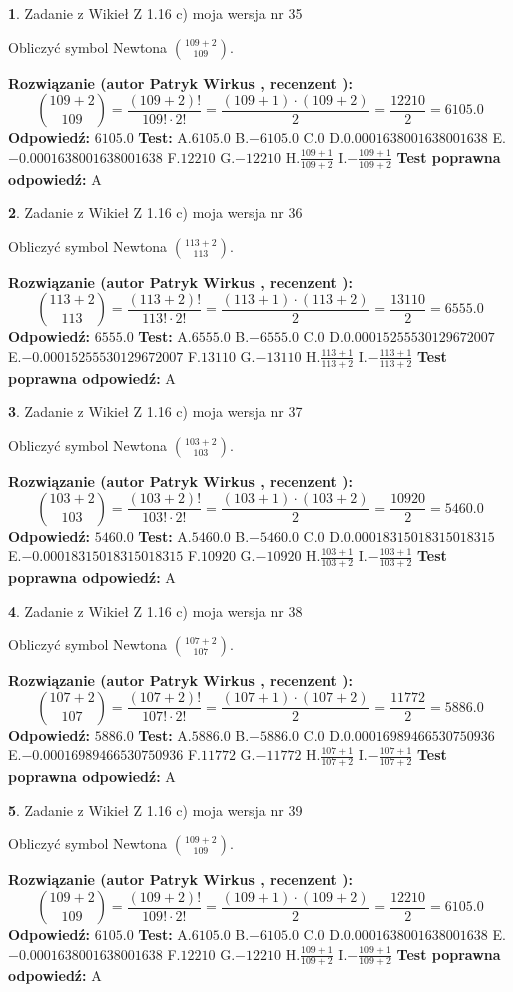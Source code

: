 \documentclass[12pt, a4paper]{article}
\theoremstyle{definition} %
\newtheorem{zad}{}
\newcommand{\zadStart}[1]{\begin{zad}#1\newline}
\newcommand{\zadStop}{\end{zad}}
\newcommand{\rozwStart}[2]{\noindent \textbf{Rozwiązanie (autor #1 , recenzent #2): }\newline}
\newcommand{\rozwStop}{\newline}
\newcommand{\odpStart}{\noindent \textbf{Odpowiedź:}\newline}
\newcommand{\odpStop}{\newline}
\newcommand{\testStart}{\noindent \textbf{Test:}\newline}
\newcommand{\testStop}{\newline}
\newcommand{\kluczStart}{\noindent \textbf{Test poprawna odpowiedź:}\newline}
\newcommand{\kluczStop}{\newline}
\begin{document}
\zadStart{Zadanie z Wikieł Z 1.16 c) moja wersja nr 35}

Obliczyć symbol Newtona ${109+2 \choose 109}$.
\zadStop
\rozwStart{Patryk Wirkus}{}
$${109+2 \choose 109} = \frac{(109+2)!}{109! \cdot 2!} = \frac{(109+1)\cdot(109+2)}{2} = \frac{12210}{2} = 6105.0$$
\rozwStop
\odpStart
$6105.0$
\odpStop
\testStart
A.$6105.0$ B.$-6105.0$ C.$0$ D.$0.0001638001638001638$ E.$-0.0001638001638001638$
F.$12210$ G.$-12210$
H.$\frac{109+1}{109+2}$
I.$-\frac{109+1}{109+2}$
\testStop
\kluczStart
A
\kluczStop



\zadStart{Zadanie z Wikieł Z 1.16 c) moja wersja nr 36}

Obliczyć symbol Newtona ${113+2 \choose 113}$.
\zadStop
\rozwStart{Patryk Wirkus}{}
$${113+2 \choose 113} = \frac{(113+2)!}{113! \cdot 2!} = \frac{(113+1)\cdot(113+2)}{2} = \frac{13110}{2} = 6555.0$$
\rozwStop
\odpStart
$6555.0$
\odpStop
\testStart
A.$6555.0$ B.$-6555.0$ C.$0$ D.$0.00015255530129672007$ E.$-0.00015255530129672007$
F.$13110$ G.$-13110$
H.$\frac{113+1}{113+2}$
I.$-\frac{113+1}{113+2}$
\testStop
\kluczStart
A
\kluczStop



\zadStart{Zadanie z Wikieł Z 1.16 c) moja wersja nr 37}

Obliczyć symbol Newtona ${103+2 \choose 103}$.
\zadStop
\rozwStart{Patryk Wirkus}{}
$${103+2 \choose 103} = \frac{(103+2)!}{103! \cdot 2!} = \frac{(103+1)\cdot(103+2)}{2} = \frac{10920}{2} = 5460.0$$
\rozwStop
\odpStart
$5460.0$
\odpStop
\testStart
A.$5460.0$ B.$-5460.0$ C.$0$ D.$0.00018315018315018315$ E.$-0.00018315018315018315$
F.$10920$ G.$-10920$
H.$\frac{103+1}{103+2}$
I.$-\frac{103+1}{103+2}$
\testStop
\kluczStart
A
\kluczStop



\zadStart{Zadanie z Wikieł Z 1.16 c) moja wersja nr 38}

Obliczyć symbol Newtona ${107+2 \choose 107}$.
\zadStop
\rozwStart{Patryk Wirkus}{}
$${107+2 \choose 107} = \frac{(107+2)!}{107! \cdot 2!} = \frac{(107+1)\cdot(107+2)}{2} = \frac{11772}{2} = 5886.0$$
\rozwStop
\odpStart
$5886.0$
\odpStop
\testStart
A.$5886.0$ B.$-5886.0$ C.$0$ D.$0.00016989466530750936$ E.$-0.00016989466530750936$
F.$11772$ G.$-11772$
H.$\frac{107+1}{107+2}$
I.$-\frac{107+1}{107+2}$
\testStop
\kluczStart
A
\kluczStop



\zadStart{Zadanie z Wikieł Z 1.16 c) moja wersja nr 39}

Obliczyć symbol Newtona ${109+2 \choose 109}$.
\zadStop
\rozwStart{Patryk Wirkus}{}
$${109+2 \choose 109} = \frac{(109+2)!}{109! \cdot 2!} = \frac{(109+1)\cdot(109+2)}{2} = \frac{12210}{2} = 6105.0$$
\rozwStop
\odpStart
$6105.0$
\odpStop
\testStart
A.$6105.0$ B.$-6105.0$ C.$0$ D.$0.0001638001638001638$ E.$-0.0001638001638001638$
F.$12210$ G.$-12210$
H.$\frac{109+1}{109+2}$
I.$-\frac{109+1}{109+2}$
\testStop
\kluczStart
A
\kluczStop
\end{document}
